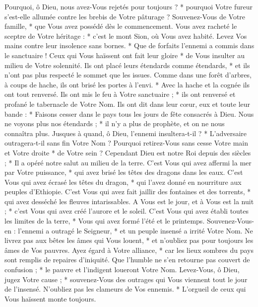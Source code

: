  Pourquoi, ô Dieu, nous avez-Vous rejetés pour toujours ? * pourquoi Votre fureur s'est-elle allumée contre les brebis de Votre pâturage ?
\versseparator
 Souvenez-Vous de Votre famille, * que Vous avez possédé dès le commencement.
\versseparator
 Vous avez racheté le sceptre de Votre héritage : * c'est le mont Sion, où Vous avez habité.
\versseparator
 Levez Vos mains contre leur insolence sans bornes. * Que de forfaits l'ennemi a commis dans le sanctuaire !
\versseparator
 Ceux qui Vous haïssent ont fait leur gloire * de Vous insulter au milieu de Votre solennité.
\versseparator
 Ils ont placé leurs étendards comme étendards, * et ils n'ont pas plus respecté le sommet que les issues.
\versseparator
 Comme dans une forêt d'arbres, à coups de hache, ils ont brisé les portes à l'envi. * Avec la hache et la cognée ils ont tout renversé.
\versseparator
 Ils ont mis le feu à Votre sanctuaire ; * ils ont renversé et profané le tabernacle de Votre Nom.
\versseparator
 Ils ont dit dans leur cœur, eux et toute leur bande : * Faisons cesser dans le pays tous les jours de fête consacrés à Dieu.
\versseparator
 Nous ne voyons plus nos étendards ; * il n'y a plus de prophète, et on ne nous connaîtra plus.
\versseparator
 Jusques à quand, ô Dieu, l'ennemi insultera-t-il ? * L'adversaire outragera-t-il sans fin Votre Nom ?
\versseparator
 Pourquoi retirez-Vous sans cesse Votre main et Votre droite * de Votre sein ?
\versseparator
 Cependant Dieu est notre Roi depuis des siècles ; * Il a opéré notre salut au milieu de la terre.
\versseparator
 C'est Vous qui avez affermi la mer par Votre puissance, * qui avez brisé les têtes des dragons dans les eaux.
\versseparator
 C'est Vous qui avez écrasé les têtes du dragon, * qui l'avez donné en nourriture aux peuples d'Ethiopie.
\versseparator
 C'est Vous qui avez fait jaillir des fontaines et des torrents, * qui avez desséché les fleuves intarissables.
\versseparator
 A Vous est le jour, et à Vous est la nuit ; * c'est Vous qui avez créé l'aurore et le soleil.
\versseparator
 C'est Vous qui avez établi toutes les limites de la terre, * Vous qui avez formé l'été et le printemps.
\versseparator
 Souvenez-Vous-en : l'ennemi a outragé le Seigneur, * et un peuple insensé a irrité Votre Nom.
\versseparator
 Ne livrez pas aux bêtes les âmes qui Vous louent, * et n'oubliez pas pour toujours les âmes de Vos pauvres.
\versseparator
 Ayez égard à Votre alliance, * car les lieux sombres du pays sont remplis de repaires d'iniquité.
\versseparator
 Que l'humble ne s'en retourne pas couvert de confusion ; * le pauvre et l'indigent loueront Votre Nom.
\versseparator
 Levez-Vous, ô Dieu, jugez Votre cause ; * souvenez-Vous des outrages qui Vous viennent tout le jour de l'insensé.
\versseparator
 N'oubliez pas les clameurs de Vos ennemis. * L'orgueil de ceux qui Vous haïssent monte toujours.